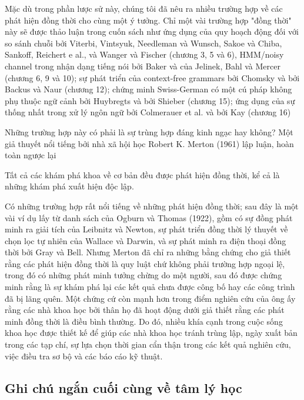 Mặc dù trong phần lược sử này, chúng tôi đã nêu ra nhiều trường hợp về các phát hiện đồng thời cho cùng một ý tưởng. Chỉ một vài trường hợp "đồng thời" này sẽ được thảo luận trong cuốn sách như ứng dụng của quy hoạch động đối với so sánh chuỗi bởi Viterbi, Vintsyuk, Needleman và Wunsch, Sakoe và Chiba, Sankoff, Reichert e al., và Wanger và Fischer (chương 3, 5 và 6), HMM/noisy channel trong nhận dạng tiếng nói bởi Baker và của Jelinek, Bahl và Mercer (chương 6, 9 và 10); sự phát triển của context-free grammars bởi Chomsky và bởi Backus và Naur (chương 12); chứng minh Swiss-German có một cú pháp không phụ thuộc ngữ cảnh bởi Huybregts và bởi Shieber (chương 15); ứng dụng của sự thống nhất trong xử lý ngôn ngữ bởi Colmerauer et al. và bởi Kay (chương 16)

Những trường hợp này có phải là sự trùng hợp đáng kinh ngạc hay không? Một giả thuyết nổi tiếng bởi nhà xã hội học Robert K. Merton (1961) lập luận, hoàn toàn ngược lại

\begin{adjustwidth}{1.5cm}{}
Tất cả các khám phá khoa về cơ bản đều được phát hiện đồng thời, kể cả là những khám phá xuất hiện độc lập.
\end{adjustwidth}

Có những trường hợp rất nổi tiếng về những phát hiện đồng thời; sau đây là một vài ví dụ lấy từ danh sách của Ogburn và Thomas (1922), gồm có sự đồng phát minh ra giải tích của Leibnitz và Newton, sự phát triển đồng thời lý thuyết về chọn lọc tự nhiên của Wallace và Darwin, và sự phát minh ra điện thoại đồng thời bởi Gray và Bell. Nhưng Merton đã chỉ ra những bằng chứng cho giả thiết rằng các phát hiện đồng thời là quy luật chứ không phải trường hợp ngoại lệ, trong đó có những phát minh tưởng chừng do một người, sau đó được chứng minh rằng là sự khám phá lại các kết quả chưa được công bố hay các công trình đã bị lãng quên. Một chứng cứ còn mạnh hơn trong điểm nghiên cứu của ông ấy rằng các nhà khoa học bởi thân họ đã hoạt động dưới giả thiết rằng các phát minh đồng thời là điều bình thường. Do đó, nhiều khía cạnh trong cuộc sống khoa học được thiết kế để giúp các nhà khoa học tránh trùng lập, ngày xuất bản trong các tạp chí, sự lựa chọn thời gian cẩn thận trong các kết quả nghiên cứu, việc điều tra sơ bộ và các báo cáo kỹ thuật.

\subsection{Ghi chú ngắn cuối cùng về tâm lý học}

